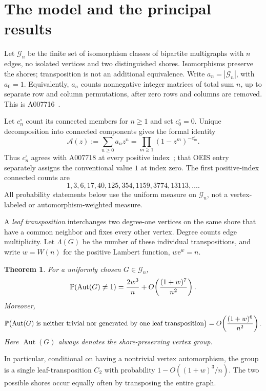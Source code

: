 \documentclass[11pt,a4paper]{article}
\newtheorem{theorem}{Theorem}[section]\newtheorem{lemma}[theorem]{Lemma}\newtheorem{proposition}[theorem]{Proposition}
\theoremstyle{remark}\newtheorem{remark}[theorem]{Remark}%
\newcommand{\Aut}{\operatorname{Aut}}\newcommand{\ee}{\mathrm e}
\begin{document}
\section{The model and the principal results}\label{bpm:sym:sec:model}
Let $\mathcal G_n$ be the finite set of isomorphism classes of bipartite multigraphs with $n$ edges, no isolated vertices and two distinguished shores. Isomorphisms preserve the shores; transposition is not an additional equivalence. Write $a_n=|\mathcal G_n|$, with $a_0=1$. Equivalently, $a_n$ counts nonnegative integer matrices of total sum $n$, up to separate row and column permutations, after zero rows and columns are removed. This is A007716~\cite{OEIS}.

Let $c^\circ_n$ count its connected members for $n\ge1$ and set $c^\circ_0=0$. Unique decomposition into connected components gives the formal identity
\begin{equation}\label{bpm:sym:eq:Euler}
 \mathcal A(z):=\sum_{n\ge0}a_nz^n=\prod_{m\ge1}(1-z^m)^{-c^\circ_m}.
\end{equation}
Thus $c^\circ_n$ agrees with A007718 at every positive index~\cite{OEIS718}; that OEIS entry separately assigns the conventional value $1$ at index zero. The first positive-index connected counts are
\[
1,3,6,17,40,125,354,1159,3774,13113,\ldots.
\]
All probability statements below use the uniform measure on $\mathcal G_n$, not a vertex-labeled or automorphism-weighted measure.

A \emph{leaf transposition} interchanges two degree-one vertices on the same shore that have a common neighbor and fixes every other vertex. Degree counts edge multiplicity. Let $\Lambda(G)$ be the number of these individual transpositions, and write $w=W(n)$ for the positive Lambert function, $w\ee^w=n$.

\begin{theorem}\label{bpm:sym:thm:sym}
For a uniformly chosen $G\in\mathcal G_n$,
\begin{equation}\label{bpm:sym:eq:sym}
 \Pp(\Aut(G)\ne1)=\frac{2w^3}{n}
       +O\!\left(\frac{(1+w)^7}{n^2}\right).
\end{equation}
Moreover,
\begin{equation}\label{bpm:sym:eq:exceptional}
 \Pp\bigl(\Aut(G)\text{ is neither trivial nor generated by one leaf transposition}\bigr)
 =O\!\left(\frac{(1+w)^6}{n^2}\right).
\end{equation}
Here $\Aut(G)$ always denotes the shore-preserving \emph{vertex} group.
\end{theorem}
In particular, conditional on having a nontrivial vertex automorphism, the group is a single leaf-transposition $C_2$ with probability $1-O((1+w)^3/n)$. The two possible shores occur equally often by transposing the entire graph.
\end{document}
